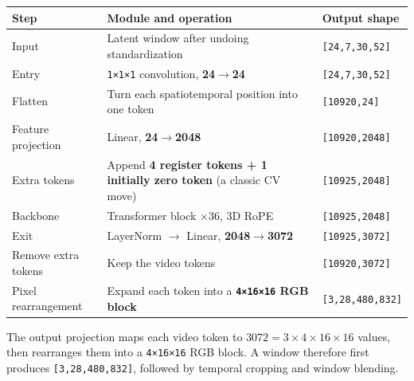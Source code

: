 \documentclass[
  11pt,
  a4paper,
]{article}
\newcounter{none} %
\begin{document}
{\def\LTcaptype{none} %
\begin{longtable}[]{@{}
  >{\raggedright\arraybackslash}p{}
  >{\raggedright\arraybackslash}p{}
  >{\raggedright\arraybackslash}p{}@{}}
\toprule\noalign{}
\begin{minipage}[b]{\linewidth}\raggedright
Step
\end{minipage} & \begin{minipage}[b]{\linewidth}\raggedright
Module and operation
\end{minipage} & \begin{minipage}[b]{\linewidth}\raggedright
Output shape
\end{minipage} \\
\midrule\noalign{}
\endhead
\bottomrule\noalign{}
\endlastfoot
Input & Latent window after undoing standardization &
\texttt{{[}24,7,30,52{]}} \\
Entry & \texttt{1×1×1} convolution, \textbf{24\(\rightarrow\)24} &
\texttt{{[}24,7,30,52{]}} \\
Flatten & Turn each spatiotemporal position into one token &
\texttt{{[}10920,24{]}} \\
Feature projection & Linear, \textbf{24\(\rightarrow\)2048} &
\texttt{{[}10920,2048{]}} \\
Extra tokens & Append \textbf{4 register tokens + 1 initially zero
token} (a classic CV move) & \texttt{{[}10925,2048{]}} \\
Backbone & Transformer block ×36, 3D RoPE & \texttt{{[}10925,2048{]}} \\
Exit & LayerNorm \(\rightarrow\) Linear,
\textbf{2048\(\rightarrow\)3072} & \texttt{{[}10925,3072{]}} \\
Remove extra tokens & Keep the video tokens &
\texttt{{[}10920,3072{]}} \\
Pixel rearrangement & Expand each token into a \textbf{\texttt{4×16×16}
RGB block} & \texttt{{[}3,28,480,832{]}} \\
\end{longtable}
}

\endgroup

The output projection maps each video token to
\textbf{\(3072=3\times4\times16\times16\)} values, then rearranges them
into a \texttt{4×16×16} RGB block. A window therefore first produces
\texttt{{[}3,28,480,832{]}}, followed by temporal cropping and window
blending.
\end{document}
